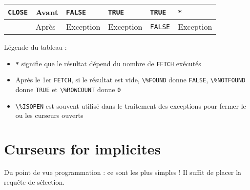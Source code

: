 \documentclass[10pt]{beamer}
\begin{document}
\begin{frame}{\secname}
\begin{table}[]
{\begin{tabular}{|l|l|l|l|l|l|}
                \lstinline[language=plsql]!CLOSE!         & Avant & \lstinline[language=plsql]!FALSE!   & \lstinline[language=plsql]!TRUE!       & \lstinline[language=plsql]!TRUE!     & \lstinline[language=plsql]!*!          \\ \hline
                                                          & Après & Exception                           & Exception                              & \lstinline[language=plsql]!FALSE!    & Exception                              \\ \hline
            \end{tabular}
        }
    \end{table}
\end{frame}

\begin{frame}{\secname}
    Légende du tableau :
    \begin{itemize}
        \item \lstinline[language=plsql]!*! signifie que le résultat dépend du nombre de \lstinline[language=plsql]!FETCH! exécutés
        \item Après le 1er \lstinline[language=plsql]!FETCH!, si le résultat est vide, \lstinline[language=plsql]!\%FOUND! donne \lstinline[language=plsql]!FALSE!, \lstinline[language=plsql]!\%NOTFOUND! donne \lstinline[language=plsql]!TRUE! et \lstinline[language=plsql]!\%ROWCOUNT! donne \lstinline[language=plsql]!0!
        \item \lstinline[language=plsql]!\%ISOPEN! est souvent utilisé dans le traitement des exceptions pour fermer le ou les curseurs ouverts
    \end{itemize}
    
\end{frame}


\section{Curseurs for implicites}
\begin{frame}{\secname}
    Du point de vue programmation : ce sont les plus simples ! Il suffit de placer la requête de sélection.
    
\end{frame}
\end{document}
